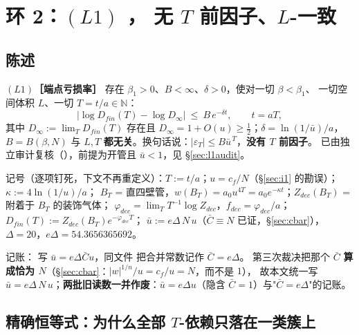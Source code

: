 \section{环 2：$(L1)$ ， 无 $T$ 前因子、$L$-一致}\label{sec:l1}

\subsection{陈述}

\begin{keybox}
\textbf{$(L1)$［端点亏损率］}\LT{} 存在 $\beta_1>0$、$B<\infty$、$\delta>0$，使对一切 $\beta<\beta_1$、
一切空间体积 $L$、一切 $T=t/a\in\mathbb{N}$：
\[
\bigl|\log D_{fin}(T)-\log D_\infty\bigr|\ \le\ B\,e^{-\delta t},\qquad t=aT,
\]
其中 $D_\infty:=\lim_TD_{fin}(T)$ 存在且 $D_\infty=1+O(u)\ge\tfrac12$；$\delta=\ln(1/\bar u)/a$，$B=B(\beta,N)$
与 $L,T$ \textbf{都无关}。换句话说：$|\varepsilon_T|\le B\bar u^{\,T}$，\textbf{没有 $T$ 前因子}。
已由独立审计复核（），前提为开管且 $\bar u<1$，见 \S\ref{sec:l1audit}。
\end{keybox}

记号（逐项钉死，下文不再重定义）：$T:=t/a$；$u=c_f/N$（\S\ref{sec:i1} 的勘误）；$\kappa:=4\ln(1/u)/a$；
$B_T$ = 直四壁管，$w(B_T)=a_0u^{4T}=a_0e^{-\kappa t}$；$Z_{dec}(B_T)$ = 附着于 $B_T$ 的装饰气体；
$\varphi_{dec}=\lim_TT^{-1}\log Z_{dec}$，$f_{dec}=\varphi_{dec}/a$；$D_{fin}(T):=Z_{dec}(B_T)e^{-\varphi_{dec}T}$；
$\bar u:=e\Delta\,N\,u$（$\bar C\equiv N$ 已证，\S\ref{sec:cbar}），$\Delta=20$，$e\Delta=54.3656365692$。

\LM{} 记账： 写 $\bar u=e\Delta\bar C u$，同文件  把合并常数记作 $\bar C=e\Delta$。
第三次裁决把那个 $\bar C$ \textbf{算成恰为 $N$}（\S\ref{sec:cbar}：$|w|^{1/n}/u=c_f/u=N$，而不是 $1$），
故本文统一写 $\bar u=e\Delta\,N\,u$；\textbf{两批旧读数一并作废}：$\bar u=e\Delta u$（隐含 $\bar C=1$）与"$\bar C=e\Delta$"的记账。

\subsection{精确恒等式：为什么全部 $T$-依赖只落在一类簇上}

